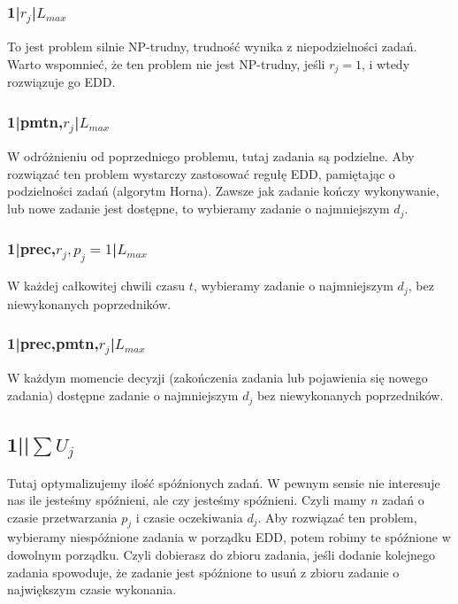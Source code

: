 \documentclass{../notatki}
\begin{document}
\subsubsection{1|\texorpdfstring{$r_j$}{rj}|\texorpdfstring{$L_{max}$}{Lmax}}

To jest problem silnie NP-trudny, trudność wynika z niepodzielności zadań.
Warto wspomnieć, że ten problem nie jest NP-trudny, jeśli $r_j = 1$, i wtedy
rozwiązuje go EDD.

\subsubsection{1|pmtn,\texorpdfstring{$r_j$}{rj}|\texorpdfstring{$L_{max}$}{Lmax}}

W odróżnieniu od poprzedniego problemu, tutaj zadania są podzielne.
Aby rozwiązać
ten problem wystarczy zastosować regułę EDD, pamiętając o
podzielności zadań (algorytm Horna).
Zawsze jak zadanie kończy wykonywanie, lub nowe zadanie jest dostępne, to
wybieramy zadanie o najmniejszym $d_j$.

\subsubsection{1|prec,\texorpdfstring{$r_j,p_j =
1$}{rj,pj=1}|\texorpdfstring{$L_{max}$}{Lmax}}

W każdej całkowitej chwili czasu $t$, wybieramy zadanie o
najmniejszym $d_j$, bez niewykonanych poprzedników.

\subsubsection{1|prec,pmtn,\texorpdfstring{$r_j$}{rj}|\texorpdfstring{$L_{max}$}{Lmax}}

W każdym momencie decyzji (zakończenia zadania lub pojawienia się
nowego zadania)
dostępne zadanie o najmniejszym $d_j$ bez niewykonanych poprzedników.

\subsection{1||\texorpdfstring{$\sum U_j$}{sum Uj}}

Tutaj optymalizujemy ilość spóźnionych zadań. W pewnym sensie nie interesuje
nas ile jesteśmy spóźnieni, ale czy jesteśmy spóźnieni. Czyli mamy $n$ zadań
o czasie przetwarzania $p_j$ i czasie oczekiwania $d_j$. Aby
rozwiązać ten problem,
wybieramy niespóźnione zadania w porządku EDD, potem robimy te
spóźnione w dowolnym porządku. Czyli dobierasz do zbioru zadania, jeśli
dodanie kolejnego zadania spowoduje, że zadanie jest spóźnione to usuń
z zbioru zadanie o największym czasie wykonania.
\end{document}
